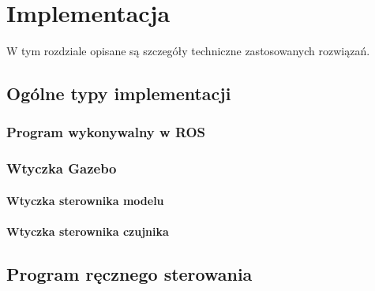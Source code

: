 \chapter{Implementacja} 
\label{sec:implementation}
W tym rozdziale opisane są szczegóły techniczne zastosowanych rozwiązań.

\section{Ogólne typy implementacji}
	\subsection{Program wykonywalny w ROS}

	\subsection{Wtyczka Gazebo}
		\subsubsection{Wtyczka sterownika modelu}
		\subsubsection{Wtyczka sterownika czujnika}
	
\section{Program ręcznego sterowania}


